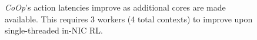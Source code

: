 \documentclass[sigconf,natbib=false]{acmart}
\newcommand{\Coopfw}{\emph{CoOp}}
\begin{document}
\begin{figure}
	\caption{\Coopfw{}'s action latencies improve as additional cores are made available. This requires \num{3} workers (4 total contexts) to improve upon single-threaded in-NIC RL.\label{fig:vary-core-latency}}
\end{figure}
\end{document}
